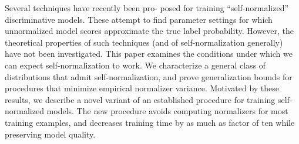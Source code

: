 Several techniques have recently been pro- posed for training ``self-normalized'' discriminative models. These attempt to find parameter settings for which unnormalized model scores approximate the true label probability. However, the theoretical properties of such techniques (and of self-normalization generally) have not been investigated. This paper examines the conditions under which we can expect self-normalization to work. We characterize a general class of distributions that admit self-normalization, and prove generalization bounds for procedures that minimize empirical normalizer variance. Motivated by these results, we describe a novel variant of an established procedure for training self-normalized models. The new procedure avoids computing normalizers for most training examples, and decreases training time by as much as factor of ten while preserving model quality.
